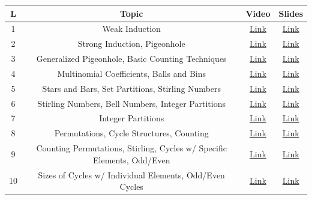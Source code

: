 \documentclass[letterpaper]{article}
\begin{document}
\begin{center}
    \begin{tabular}{|c|c|c|c|}
        \hline 
        \textbf{L} & \textbf{Topic} & \textbf{Video} & \textbf{Slides} \\ 
        \hline 
        1 & Weak Induction & \href{http://cseweb.ucsd.edu/~dakane/Math184/Lec1.html}{Link} & \href{http://cseweb.ucsd.edu/~dakane/Math184/Lec1.pdf}{Link} \\ 
        \hline
        2 & Strong Induction, Pigeonhole & \href{http://cseweb.ucsd.edu/~dakane/Math184/Lec2.html}{Link} & \href{http://cseweb.ucsd.edu/~dakane/Math184/Lec2.pdf}{Link} \\ 
        \hline
        3 & Generalized Pigeonhole, Basic Counting Techniques & \href{http://cseweb.ucsd.edu/~dakane/Math184/Lec3.html}{Link} & \href{http://cseweb.ucsd.edu/~dakane/Math184/Lec3.pdf}{Link} \\ 
        \hline
        4 & Multinomial Coefficients, Balls and Bins & \href{http://cseweb.ucsd.edu/~dakane/Math184/Lec4.html}{Link} & \href{http://cseweb.ucsd.edu/~dakane/Math184/Lec4.pdf}{Link} \\ 
        \hline
        5 & Stars and Bars, Set Partitions, Stirling Numbers & \href{http://cseweb.ucsd.edu/~dakane/Math184/Lec5.html}{Link} & \href{http://cseweb.ucsd.edu/~dakane/Math184/Lec5.pdf}{Link} \\ 
        \hline
        6 & Stirling Numbers, Bell Numbers, Integer Partitions & \href{http://cseweb.ucsd.edu/~dakane/Math184/Lec6.html}{Link} & \href{http://cseweb.ucsd.edu/~dakane/Math184/Lec6.pdf}{Link} \\ 
        \hline
        7 & Integer Partitions & \href{http://cseweb.ucsd.edu/~dakane/Math184/Lec7.html}{Link} & \href{http://cseweb.ucsd.edu/~dakane/Math184/Lec7.pdf}{Link} \\ 
        \hline
        8 & Permutations, Cycle Structures, Counting & \href{http://cseweb.ucsd.edu/~dakane/Math184/Lec8.html}{Link} & \href{http://cseweb.ucsd.edu/~dakane/Math184/Lec8.pdf}{Link} \\ 
        \hline
        9 & Counting Permutations, Stirling, Cycles w/ Specific Elements, Odd/Even & \href{http://cseweb.ucsd.edu/~dakane/Math184/Lec9.html}{Link} & \href{http://cseweb.ucsd.edu/~dakane/Math184/Lec9.pdf}{Link} \\ 
        \hline
        10 & Sizes of Cycles w/ Individual Elements, Odd/Even Cycles & \href{http://cseweb.ucsd.edu/~dakane/Math184/Lec10.html}{Link} & \href{http://cseweb.ucsd.edu/~dakane/Math184/Lec10.pdf}{Link} \\ 

\end{tabular}
\end{center}
\end{document}
